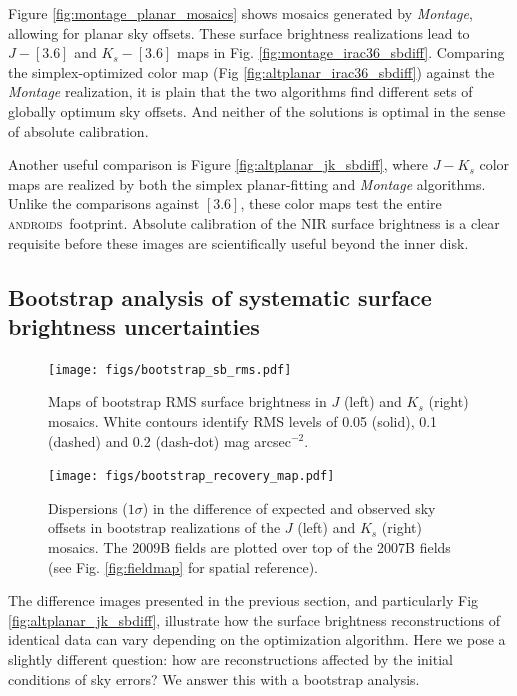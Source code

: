 \documentclass[iop]{emulateapj}
\newcommand{\sw}[1]{\textit{#1}} %
\newcommand{\androids}{\textsc{androids}}
\begin{document}
Figure \ref{fig:montage_planar_mosaics} shows mosaics generated by \sw{Montage}, allowing for planar sky offsets. These surface brightness realizations lead to $J-[3.6]$ and $K_s-[3.6]$ maps in Fig. \ref{fig:montage_irac36_sbdiff}. Comparing the simplex-optimized color map (Fig \ref{fig:altplanar_irac36_sbdiff}) against the \sw{Montage} realization, it is plain that the two algorithms find different sets of globally optimum sky offsets. And neither of the solutions is optimal in the sense of absolute calibration.

Another useful comparison is Figure \ref{fig:altplanar_jk_sbdiff}, where $J-K_s$ color maps are realized by both the simplex planar-fitting and \sw{Montage} algorithms. Unlike the comparisons against $[3.6]$, these color maps test the entire \androids\ footprint. Absolute calibration of the NIR surface brightness is a clear requisite before these images are scientifically useful beyond the inner disk.

\subsection{Bootstrap analysis of systematic surface brightness uncertainties}

\begin{figure}[t]
    \centering
        \texttt{[image: figs/bootstrap\_sb\_rms.pdf]}
    \caption{Maps of bootstrap RMS surface brightness in $J$ (left) and $K_s$ (right) mosaics. White contours identify RMS levels of 0.05 (solid), 0.1 (dashed) and 0.2 (dash-dot) mag arcsec$^{-2}$.}
    \label{fig:bootstrap_sb_rms}
\end{figure}

\begin{figure}[t]
    \centering
        \texttt{[image: figs/bootstrap\_recovery\_map.pdf]}
    \caption{Dispersions ($1\sigma$) in the difference of expected and observed sky offsets in bootstrap realizations of the $J$ (left) and $K_s$ (right) mosaics. The 2009B fields are plotted over top of the 2007B fields (see Fig. \ref{fig:fieldmap} for spatial reference).}
    \label{fig:bootstrap_recovery_map}
\end{figure}


The difference images presented in the previous section, and particularly Fig \ref{fig:altplanar_jk_sbdiff}, illustrate how the surface brightness reconstructions of identical data can vary depending on the optimization algorithm. Here we pose a slightly different question: how are reconstructions affected by the initial conditions of sky errors? We answer this with a bootstrap analysis.
\end{document}
